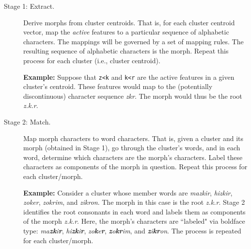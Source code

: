 \begin{description}
\item[Stage 1: Extract.] Derive morphs from cluster centroids. That is, for each cluster centroid vector,  map the \emph{active} features to a particular sequence of alphabetic characters. The mappings will be governed by a set of mapping rules. The resulting sequence of alphabetic characters is the morph. Repeat this process for each cluster (i.e., cluster centroid).

\textbf{Example:} Suppose that \texttt{z<k} and \texttt{k<r} are the active features in a given cluster's centroid. These features would map to the (potentially discontinuous) character sequence \textit{zkr}. The morph would thus be the root \textit{z.k.r}.

\item[Stage 2: Match.] Map morph characters to word characters. That is, given a cluster and its morph (obtained in Stage 1), go through the cluster's words, and in each word, determine which characters are the morph's characters. Label these characters as components of the morph in question. Repeat this process for each cluster/morph.

\textbf{Example:}  
Consider a cluster whose member words are \textit{mazkir}, \textit{hizkir}, \textit{zoker}, \textit{zokrim}, and \textit{zikron}. The morph in this case is the root \textit{z.k.r}. Stage 2 identifies the root consonants in each word and labels them as components of the morph \textit{z.k.r}. Here, the morph's characters are ``labeled" via boldface type:
\textit{ma\textbf{zk}i\textbf{r}},
\textit{hi\textbf{zk}i\textbf{r}}, \textit{{z}o\textbf{k}e\textbf{r}}, \textit{\textbf{z}o\textbf{kr}im},
and \textit{\textbf{z}i\textbf{kr}on}.
The process is repeated for each cluster/morph.


\end{description}
